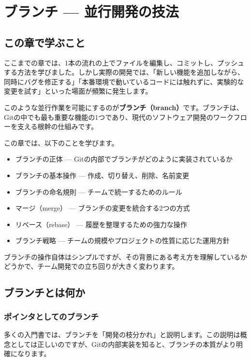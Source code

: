 \chapter{ブランチ — 並行開発の技法}

\section{この章で学ぶこと}

ここまでの章では、1本の流れの上でファイルを編集し、コミットし、プッシュする方法を学びました。しかし実際の開発では、「新しい機能を追加しながら、同時にバグを修正する」「本番環境で動いているコードには触れずに、実験的な変更を試す」といった場面が頻繁に発生します。

このような並行作業を可能にするのが\textbf{ブランチ（branch）}です。ブランチは、Gitの中でも最も重要な機能の1つであり、現代のソフトウェア開発のワークフローを支える根幹の仕組みです。

この章では、以下のことを学びます。

\begin{itemize}
  \item ブランチの正体 — Gitの内部でブランチがどのように実装されているか
  \item ブランチの基本操作 — 作成、切り替え、削除、名前変更
  \item ブランチの命名規則 — チームで統一するためのルール
  \item マージ（merge） — ブランチの変更を統合する2つの方式
  \item リベース（rebase） — 履歴を整理するための強力な操作
  \item ブランチ戦略 — チームの規模やプロジェクトの性質に応じた運用方針
\end{itemize}

ブランチの操作自体はシンプルですが、その背景にある考え方を理解しているかどうかで、チーム開発での立ち回りが大きく変わります。

\section{ブランチとは何か}

\subsection{ポインタとしてのブランチ}

多くの入門書では、ブランチを「開発の枝分かれ」と説明します。この説明は概念としては正しいのですが、Gitの内部実装を知ると、ブランチの本質がより明確になります。

